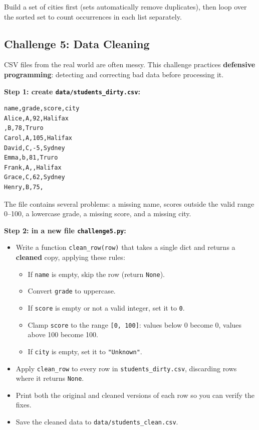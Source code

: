 \documentclass{cslab}
\begin{document}
\begin{hint}
Build a set of cities first (sets automatically remove duplicates), then loop over the sorted set to count occurrences in each list separately.
\end{hint}

\subsection*{Challenge 5: Data Cleaning}

CSV files from the real world are often messy. This challenge practices \textbf{defensive programming}: detecting and correcting bad data before processing it.

\textbf{Step 1: create \texttt{data/students\_dirty.csv}:}
\begin{lstlisting}[language={},numbers=none,frame=single]
name,grade,score,city
Alice,A,92,Halifax
,B,78,Truro
Carol,A,105,Halifax
David,C,-5,Sydney
Emma,b,81,Truro
Frank,A,,Halifax
Grace,C,62,Sydney
Henry,B,75,
\end{lstlisting}

The file contains several problems: a missing name, scores outside the valid range 0--100, a lowercase grade, a missing score, and a missing city.

\textbf{Step 2: in a new file \texttt{challenge5.py}:}
\begin{itemize}
    \item Write a function \texttt{clean\_row(row)} that takes a single dict and returns a \textbf{cleaned} copy, applying these rules:
    \begin{itemize}
        \item If \texttt{name} is empty, skip the row (return \texttt{None}).
        \item Convert \texttt{grade} to uppercase.
        \item If \texttt{score} is empty or not a valid integer, set it to \texttt{0}.
        \item Clamp \texttt{score} to the range \texttt{[0, 100]}: values below 0 become 0, values above 100 become 100.
        \item If \texttt{city} is empty, set it to \texttt{"Unknown"}.
    \end{itemize}
    \item Apply \texttt{clean\_row} to every row in \texttt{students\_dirty.csv}, discarding rows where it returns \texttt{None}.
    \item Print both the original and cleaned versions of each row so you can verify the fixes.
    \item Save the cleaned data to \texttt{data/students\_clean.csv}.
\end{itemize}
\end{document}
